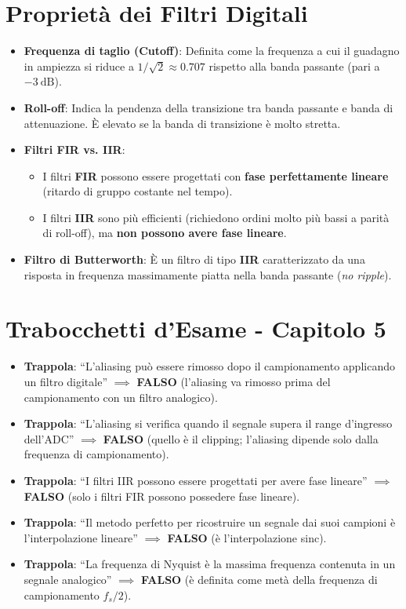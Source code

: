 \documentclass[10pt, letterpaper]{report}
\begin{document}
\section{Proprietà dei Filtri Digitali}
\begin{itemize}
    \item \textbf{Frequenza di taglio (Cutoff)}: Definita come la frequenza a cui il guadagno in ampiezza si riduce a \(1/\sqrt{2} \approx 0.707\) rispetto alla banda passante (pari a \(-3\ \text{dB}\)).
    \item \textbf{Roll-off}: Indica la pendenza della transizione tra banda passante e banda di attenuazione. È elevato se la banda di transizione è molto stretta.
    \item \textbf{Filtri FIR vs. IIR}:
    \begin{itemize}
        \item I filtri \textbf{FIR} possono essere progettati con \textbf{fase perfettamente lineare} (ritardo di gruppo costante nel tempo).
        \item I filtri \textbf{IIR} sono più efficienti (richiedono ordini molto più bassi a parità di roll-off), ma \textbf{non possono avere fase lineare}.
    \end{itemize}
    \item \textbf{Filtro di Butterworth}: È un filtro di tipo \textbf{IIR} caratterizzato da una risposta in frequenza massimamente piatta nella banda passante (\emph{no ripple}).
\end{itemize}

\section*{Trabocchetti d'Esame - Capitolo 5}
\begin{itemize}
    \item \textbf{Trappola}: ``L'aliasing può essere rimosso dopo il campionamento applicando un filtro digitale'' \(\implies\) \textbf{FALSO} (l'aliasing va rimosso prima del campionamento con un filtro analogico).
    \item \textbf{Trappola}: ``L'aliasing si verifica quando il segnale supera il range d'ingresso dell'ADC'' \(\implies\) \textbf{FALSO} (quello è il clipping; l'aliasing dipende solo dalla frequenza di campionamento).
    \item \textbf{Trappola}: ``I filtri IIR possono essere progettati per avere fase lineare'' \(\implies\) \textbf{FALSO} (solo i filtri FIR possono possedere fase lineare).
    \item \textbf{Trappola}: ``Il metodo perfetto per ricostruire un segnale dai suoi campioni è l'interpolazione lineare'' \(\implies\) \textbf{FALSO} (è l'interpolazione sinc).
    \item \textbf{Trappola}: ``La frequenza di Nyquist è la massima frequenza contenuta in un segnale analogico'' \(\implies\) \textbf{FALSO} (è definita come metà della frequenza di campionamento \(f_s/2\)).
\end{itemize}
\end{document}
